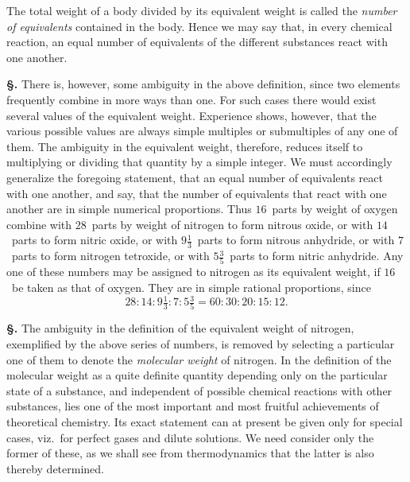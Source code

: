 \documentclass[12pt]{book}[2005/09/16]
\newcommand{\Section}[1]{
  \medskip\par\textbf{§\;#1}
  \label{section:#1}
}
\newcommand{\PageSep}[1]{\ignorespaces}
\begin{document}
The total weight of a body divided by its equivalent
%
weight is called the \emph{number of equivalents} contained in the
body. Hence we may say that, in every chemical reaction,
an equal number of equivalents of the different substances
react with one another.

\Section{35.} There is, however, some ambiguity in the above
definition, since two elements frequently combine in more
ways than one. For such cases there would exist several
values of the equivalent weight. Experience shows, however,
%
that the various possible values are always simple
multiples or submultiples of any one of them. The
ambiguity in the equivalent weight, therefore, reduces itself
to multiplying or dividing that quantity by a simple integer.
We must accordingly generalize the foregoing statement,
that an equal number of equivalents react with one another,
and say, that the number of equivalents that react with one
another are in simple numerical proportions. Thus $16$~parts
by weight of oxygen combine with $28$~parts by weight of
nitrogen to form nitrous oxide, or with $14$~parts to form
%
%
nitric oxide, or with $9\frac{1}{3}$~parts to form nitrous anhydride, or
with $7$~parts to form nitrogen tetroxide, or with $5\frac{3}{5}$~parts to
\PageSep{24}
form nitric anhydride. Any one of these numbers may be
assigned to nitrogen as its equivalent weight, if $16$~be taken
as that of oxygen. They are in simple rational proportions,
since
\[
28 : 14 : 9\tfrac{1}{3} : 7 : 5\tfrac{3}{5} = 60 : 30 : 20 : 15 : 12.
\]

\Section{36.} The ambiguity in the definition of the equivalent
weight of nitrogen, exemplified by the above series of
numbers, is removed by selecting a particular one of them
to denote the \emph{molecular weight} of nitrogen. In the definition
of the molecular weight as a quite definite quantity depending
only on the particular state of a substance, and
independent of possible chemical reactions with other substances,
lies one of the most important and most fruitful
achievements of theoretical chemistry. Its exact statement
can at present be given only for special cases, viz.\ for
perfect gases and dilute solutions. We need consider only
the former of these, as we shall see from thermodynamics
that the latter is also thereby determined.
\end{document}

